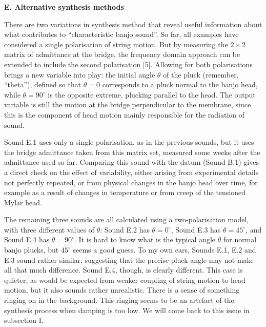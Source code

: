 \audio{}

\audio{}

\audio{}

  \textbf{E. Alternative synthesis methods} 

  There are two variations in synthesis method that reveal useful information 
  about what contributes to ``characteristic banjo sound''. So far, all 
  examples have considered a single polarisation of string motion. But by 
  measuring the $2 \times 2$ matrix of admittance at the bridge, the frequency 
  domain approach can be extended to include the second polarisation [5]. 
  Allowing for both polarisations brings a new variable into play: the initial 
  angle $\theta$ of the pluck (remember, ``theta''), defined so that $\theta = 
  0$ corresponds to a pluck normal to the banjo head, while $\theta = 90^\circ$ 
  is the opposite extreme, plucking parallel to the head. The output variable 
  is still the motion at the bridge perpendicular to the membrane, since this 
  is the component of head motion mainly responsible for the radiation of 
  sound. 

  Sound E.1 uses only a single polarisation, as in the previous sounds, but it 
  uses the bridge admittance taken from this matrix set, measured some weeks 
  after the admittance used so far. Comparing this sound with the datum (Sound 
  B.1) gives a direct check on the effect of variability, either arising from 
  experimental details not perfectly repeated, or from physical changes in the 
  banjo head over time, for example as a result of changes in temperature or 
  from creep of the tensioned Mylar head. 

\audio{}

  The remaining three sounds are all calculated using a two-polarisation model, 
  with three different values of $\theta$: Sound E.2 has $\theta = 0^\circ$, 
  Sound E.3 has $\theta = 45^\circ$, and Sound E.4 has $\theta = 90^\circ$. It 
  is hard to know what is the typical angle $\theta$ for normal banjo plucks, 
  but $45^\circ$ seems a good guess. To my own ears, Sounds E.1, E.2 and E.3 
  sound rather similar, suggesting that the precise pluck angle may not make 
  all that much difference. Sound E.4, though, is clearly different. This case 
  is quieter, as would be expected from weaker coupling of string motion to 
  head motion, but it also sounds rather unrealistic. There is a sense of 
  something ringing on in the background. This ringing seems to be an artefact 
  of the synthesis process when damping is too low. We will come back to this 
  issue in subsection I. 

